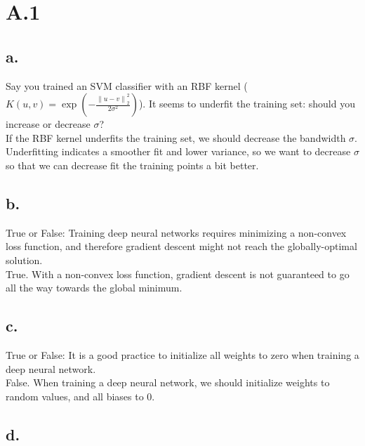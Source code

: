 \documentclass{article}
\date{{}}
\newcommand{\1}{\mathbf{1}}
\newcommand{\norm}[1]{\left\|#1\right\|}
\begin{document}
\thispagestyle{firstpageheader}

\section*{A.1}
{\Large 


\subsection*{a.}

Say you trained an SVM classifier with an RBF kernel ($K(u, v) = \exp\left(-\frac{\norm{u-v}^2_2}{2\sigma^2}\right)$). It seems to underfit the training set: should you increase or decrease $\sigma$? \\

If the RBF kernel underfits the training set, we should decrease the bandwidth $\sigma$. Underfitting indicates a smoother fit and lower variance, so we want to decrease $\sigma$ so that we can decrease fit the training points a bit better.

\subsection*{b.}

True or False: Training deep neural networks requires minimizing a non-convex loss function, and therefore gradient descent might not reach the globally-optimal solution. \\

True. With a non-convex loss function, gradient descent is not guaranteed to go all the way towards the global minimum.

\subsection*{c.}

True or False: It is a good practice to initialize all weights to zero when training a deep neural network. \\

False. When training a deep neural network, we should initialize weights to random values, and all biases to 0.

\subsection*{d.}

}
\end{document}
